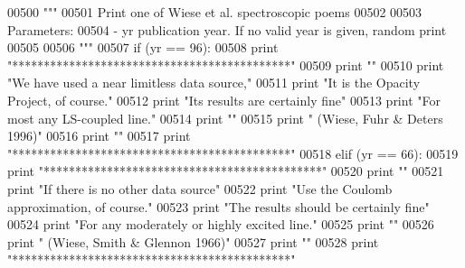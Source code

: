 \begin{DoxyCode}
00500         \textcolor{stringliteral}{"""}
00501 \textcolor{stringliteral}{        Print one of Wiese et al. spectroscopic poems}
00502 \textcolor{stringliteral}{        }
00503 \textcolor{stringliteral}{        Parameters:}
00504 \textcolor{stringliteral}{            - yr     publication year. If no valid year is given, random print}
00505 \textcolor{stringliteral}{ }
00506 \textcolor{stringliteral}{        """}
00507         \textcolor{keywordflow}{if} (yr == 96):
00508             \textcolor{keywordflow}{print} \textcolor{stringliteral}{"********************************************"}
00509             \textcolor{keywordflow}{print} \textcolor{stringliteral}{""}
00510             \textcolor{keywordflow}{print} \textcolor{stringliteral}{"We have used a near limitless data source,"}
00511             \textcolor{keywordflow}{print} \textcolor{stringliteral}{"It is the Opacity Project, of course."}
00512             \textcolor{keywordflow}{print} \textcolor{stringliteral}{"Its results are certainly fine"}
00513             \textcolor{keywordflow}{print} \textcolor{stringliteral}{"For most any LS-coupled line."}        
00514             \textcolor{keywordflow}{print} \textcolor{stringliteral}{""}
00515             \textcolor{keywordflow}{print} \textcolor{stringliteral}{"            (Wiese, Fuhr & Deters 1996)"}
00516             \textcolor{keywordflow}{print} \textcolor{stringliteral}{""}
00517             \textcolor{keywordflow}{print} \textcolor{stringliteral}{"********************************************"}
00518         \textcolor{keywordflow}{elif} (yr == 66):
00519             \textcolor{keywordflow}{print} \textcolor{stringliteral}{"********************************************"}
00520             \textcolor{keywordflow}{print} \textcolor{stringliteral}{""}
00521             \textcolor{keywordflow}{print} \textcolor{stringliteral}{"If there is no other data source"}
00522             \textcolor{keywordflow}{print} \textcolor{stringliteral}{"Use the Coulomb approximation, of course."}    
00523             \textcolor{keywordflow}{print} \textcolor{stringliteral}{"The results should be certainly fine"}
00524             \textcolor{keywordflow}{print} \textcolor{stringliteral}{"For any moderately or highly excited line."}
00525             \textcolor{keywordflow}{print} \textcolor{stringliteral}{""}
00526             \textcolor{keywordflow}{print} \textcolor{stringliteral}{"            (Wiese, Smith & Glennon 1966)"} 
00527             \textcolor{keywordflow}{print} \textcolor{stringliteral}{""}
00528             \textcolor{keywordflow}{print} \textcolor{stringliteral}{"********************************************"}

\end{DoxyCode}
